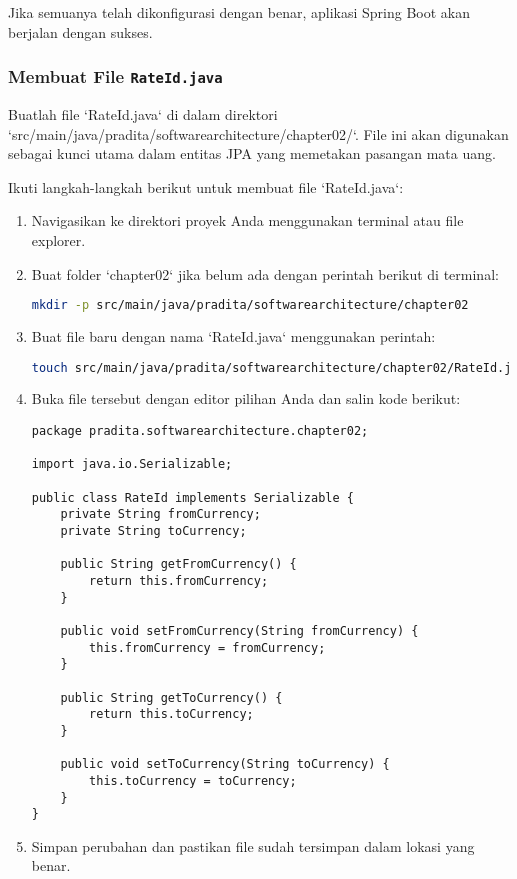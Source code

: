 Jika semuanya telah dikonfigurasi dengan benar, aplikasi Spring Boot akan berjalan dengan sukses.


\subsubsection{Membuat File \texttt{RateId.java}}
Buatlah file `RateId.java` di dalam direktori `src/main/java/pradita/softwarearchitecture/chapter02/`. File ini akan digunakan sebagai kunci utama dalam entitas JPA yang memetakan pasangan mata uang.

Ikuti langkah-langkah berikut untuk membuat file `RateId.java`:

\begin{enumerate}
\item Navigasikan ke direktori proyek Anda menggunakan terminal atau file explorer.
\item Buat folder `chapter02` jika belum ada dengan perintah berikut di terminal:

\begin{lstlisting}[language=bash]
mkdir -p src/main/java/pradita/softwarearchitecture/chapter02
\end{lstlisting}

\item Buat file baru dengan nama `RateId.java` menggunakan perintah:

\begin{lstlisting}[language=bash]
touch src/main/java/pradita/softwarearchitecture/chapter02/RateId.java
\end{lstlisting}

\item Buka file tersebut dengan editor pilihan Anda dan salin kode berikut:

\begin{lstlisting}[style=JavaStyle]
package pradita.softwarearchitecture.chapter02;

import java.io.Serializable;

public class RateId implements Serializable {
	private String fromCurrency;
	private String toCurrency;
	
	public String getFromCurrency() {
		return this.fromCurrency;
	}
	
	public void setFromCurrency(String fromCurrency) {
		this.fromCurrency = fromCurrency;
	}
	
	public String getToCurrency() {
		return this.toCurrency;
	}
	
	public void setToCurrency(String toCurrency) {
		this.toCurrency = toCurrency;
	}
}
\end{lstlisting}

\item Simpan perubahan dan pastikan file sudah tersimpan dalam lokasi yang benar.
\end{enumerate}


